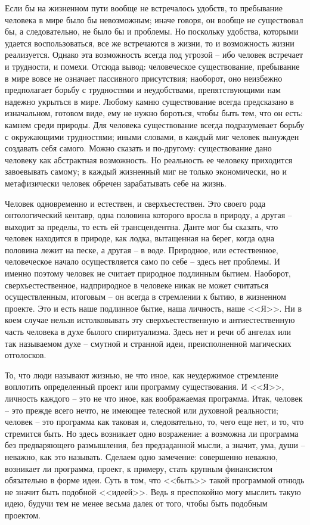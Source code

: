 Если бы на жизненном пути вообще не встречалось удобств, то пребывание 
человека в мире было бы невозможным; иначе говоря, он вообще не существовал 
бы, а следовательно, не было бы и проблемы. Но поскольку удобства, которыми 
удается воспользоваться, все же встречаются в жизни, то и возможность жизни 
реализуется. Однако эта возможность всегда под угрозой -- ибо человек 
встречает и трудности, и помехи. Отсюда вывод: человеческое существование, 
пребывание в мире вовсе не означает пассивного присутствия; наоборот, оно 
неизбежно предполагает борьбу с трудностями и неудобствами, препятствующими 
нам надежно укрыться в мире. Любому камню существование всегда предсказано в 
изначальном, готовом виде, ему не нужно бороться, чтобы быть тем, что он есть: 
камнем среди природы. Для человека существование всегда подразумевает борьбу с 
окружающими трудностями; иными словами, в каждый миг человек вынужден 
создавать себя самого. Можно сказать и по-другому: существование дано человеку 
как абстрактная возможность. Но реальность ее человеку приходится завоевывать 
самому; в каждый жизненный миг не только экономически, но и метафизически 
человек обречен зарабатывать себе на жизнь.

Человек одновременно и естествен, и сверхъестествен. Это своего рода 
онтологический кентавр, одна половина которого вросла в природу, а другая -- 
выходит за пределы, то есть ей трансцендентна. Данте мог бы сказать, что 
человек находится в природе, как лодка, вытащенная на берег, когда одна 
половина лежит на песке, а другая -- в воде. Природное, или естественное, 
человеческое начало осуществляется само по себе -- здесь нет проблемы. И 
именно поэтому человек не считает природное подлинным бытием. Наоборот, 
сверхъестественное, надприродное в человеке никак не может считаться 
осуществленным, итоговым -- он всегда в стремлении к бытию, в жизненном 
проекте. Это и есть наше подлинное бытие, наша личность, наше <<Я>>. Ни в 
коем случае нельзя истолковывать эту сверхъестественную и антиестественную 
часть человека в духе былого спиритуализма. Здесь нет и речи об ангелах или 
так называемом духе -- смутной и странной идеи, преисполненной магических 
отголосков.

То, что люди называют жизнью, не что иное, как неудержимое стремление воплотить 
определенный проект или программу существования. И <<Я>>, личность каждого -- 
это не что иное, как воображаемая программа. Итак, человек -- это 
прежде всего нечто, не имеющее телесной или духовной реальности; человек -- 
это программа как таковая и, следовательно, то, чего еще нет, и то, что 
стремится быть. Но здесь возникает одно возражение: а возможна ли программа 
без предваряющего размышления, без предзаданной мысли, а значит, ума, души -- 
неважно, как это называть. Сделаем одно замечение: совершенно неважно, 
возникает ли программа, проект, к примеру, стать крупным финансистом 
обязательно в форме идеи. Суть в том, что <<быть>> такой программой отнюдь не 
значит быть подобной <<идеей>>. Ведь я преспокойно могу мыслить такую идею, 
будучи тем не менее весьма далек от того, чтобы быть подобным проектом.

